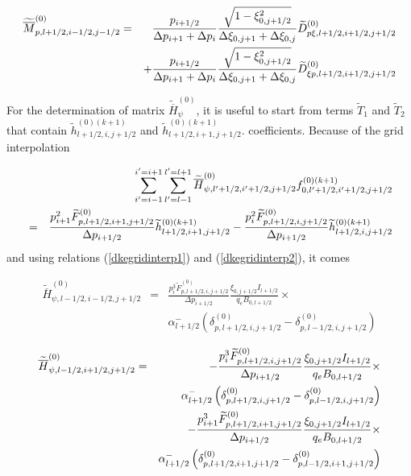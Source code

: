 \begin{eqnarray}
\widetilde{\overline{M}}_{p,l+1/2,i-1/2,j-1/2}^{\left( 0\right) } &=&\frac{%
p_{i+1/2}}{\Delta p_{i+1}+\Delta p_{i}}\frac{\sqrt{1-\xi _{0,j+1/2}^{2}}}{%
\Delta \xi _{0,j+1}+\Delta \xi _{0,j}}\widetilde{D}_{p\xi
,l+1/2,i+1/2,j+1/2}^{\left( 0\right) }  \nonumber \\
&&+\frac{p_{i+1/2}}{\Delta p_{i+1}+\Delta p_{i}}\frac{\sqrt{1-\xi
_{0,j+1/2}^{2}}}{\Delta \xi _{0,j+1}+\Delta \xi _{0,j}}\widetilde{D}_{\xi
p,l+1/2,i+1/2,j+1/2}^{\left( 0\right) }\nonumber \\
\end{eqnarray}

For the determination of matrix $\widetilde{\overline{H}}_{\psi }^{\left(
0\right) }$, it is useful to start from terms $\widetilde{T}_{1}$ and $%
\widetilde{T}_{2}$ that contain $\widetilde{h}_{l+1/2,i,j+1/2}^{\left(
0\right) (k+1)}$ and $\widetilde{h}_{l+1/2,i+1,j+1/2}^{\left( 0\right)
(k+1)}.$ coefficients. Because of the grid interpolation

\begin{eqnarray}
&&\sum_{i^{\prime }=i-1}^{i^{\prime }=i+1}\sum_{l^{\prime }=l-1}^{l^{\prime
}=l+1}\widetilde{\overline{H}}_{\psi ,l^{\prime }+1/2,i^{\prime
}+1/2,j+1/2}^{\left( 0\right) }f_{0,l^{\prime }+1/2,i^{\prime
}+1/2,j+1/2}^{\left( 0\right) (k+1)}  \nonumber \\
&=&\frac{p_{i+1}^{2}\widetilde{F}_{p,l+1/2,i+1,j+1/2}^{\left( 0\right) }}{%
\Delta p_{i+1/2}}\widetilde{h}_{l+1/2,i+1,j+1/2}^{\left( 0\right) (k+1)}-%
\frac{p_{i}^{2}\widetilde{F}_{p,l+1/2,i,j+1/2}^{\left( 0\right) }}{\Delta %
p_{i+1/2}}\widetilde{h}_{l+1/2,i,j+1/2}^{\left( 0\right) (k+1)}
\end{eqnarray}
and using relations (\ref{dkegridinterp1}) and (\ref{dkegridinterp2}), it
comes

\begin{eqnarray}
\widetilde{\overline{H}}_{\psi ,l-1/2,i-1/2,j+1/2}^{\left( 0\right) } &=&%
\frac{p_{i}^{3}\widetilde{F}_{p,l+1/2,i,j+1/2}^{\left( 0\right) }}{\Delta %
p_{i+1/2}}\frac{\xi _{0,j+1/2}I_{l+1/2}}{q_{e}B_{0,l+1/2}}\times   \nonumber
\\
&&\alpha _{l+1/2}^{-}\left( \delta _{p,l+1/2,i,j+1/2}^{(0)}-\delta
_{p,l-1/2,i,j+1/2}^{(0)}\right)
\end{eqnarray}

\begin{eqnarray}
\widetilde{\overline{H}}_{\psi ,l-1/2,i+1/2,j+1/2}^{\left( 0\right) } &=&-%
\frac{p_{i}^{3}\widetilde{F}_{p,l+1/2,i,j+1/2}^{\left( 0\right) }}{\Delta %
p_{i+1/2}}\frac{\xi _{0,j+1/2}I_{l+1/2}}{q_{e}B_{0,l+1/2}}\times   \nonumber
\\
&&\alpha _{l+1/2}^{-}\left( \delta _{p,l+1/2,i,j+1/2}^{(0)}-\delta
_{p,l-1/2,i,j+1/2}^{(0)}\right)   \nonumber \\
&&-\frac{p_{i+1}^{3}\widetilde{F}_{p,l+1/2,i+1,j+1/2}^{\left( 0\right) }}{%
\Delta p_{i+1/2}}\frac{\xi _{0,j+1/2}I_{l+1/2}}{q_{e}B_{0,l+1/2}}\times
\nonumber \\
&&\alpha _{l+1/2}^{-}\left( \delta _{p,l+1/2,i+1,j+1/2}^{(0)}-\delta
_{p,l-1/2,i+1,j+1/2}^{(0)}\right)
\end{eqnarray}

